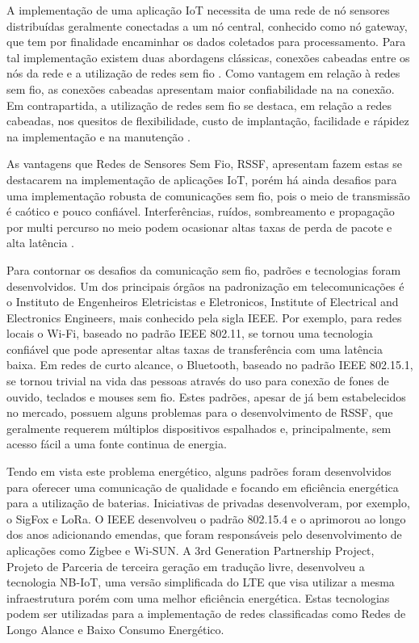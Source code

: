 A implementação de uma aplicação IoT necessita de uma rede de nó sensores distribuídas geralmente conectadas a um nó central, conhecido como nó gateway, que tem por finalidade encaminhar os dados coletados para processamento. Para tal implementação existem duas abordagens clássicas, conexões cabeadas entre os nós da rede e a utilização de redes sem fio \cite{gomes2017estimaccao}. Como vantagem em relação à redes sem fio, as conexões cabeadas apresentam maior confiabilidade na na conexão. Em contrapartida, a utilização de redes sem fio se destaca, em relação a redes cabeadas, nos quesitos de flexibilidade, custo de implantação, facilidade e rápidez na implementação e na manutenção \cite{gungor2009industrial}.

As vantagens que Redes de Sensores Sem Fio, RSSF, apresentam fazem estas se destacarem na implementação de aplicações IoT, porém há ainda desafios para uma implementação robusta de comunicações sem fio, pois o meio de transmissão é caótico e pouco confiável. Interferências, ruídos, sombreamento e propagação por multi percurso no meio podem ocasionar altas taxas de perda de pacote e alta latência \cite{gomes2017estimaccao}.

Para contornar os desafios da comunicação sem fio, padrões e tecnologias foram desenvolvidos. Um dos principais órgãos na padronização em telecomunicações é o Instituto de Engenheiros Eletricistas e Eletronicos, Institute of Electrical and Electronics Engineers, mais conhecido pela sigla IEEE. Por exemplo, para redes locais o Wi-Fi, baseado no padrão IEEE 802.11, se tornou uma tecnologia confiável que pode apresentar altas taxas de transferência com uma latência baixa. Em redes de curto alcance, o Bluetooth, baseado no padrão IEEE 802.15.1, se tornou trivial na vida das pessoas através do uso para conexão de fones de ouvido, teclados e mouses sem fio. Estes padrões, apesar de já bem estabelecidos no mercado, possuem alguns problemas para o desenvolvimento de RSSF, que geralmente requerem múltiplos dispositivos espalhados e, principalmente, sem acesso fácil a uma fonte continua de energia.

Tendo em vista este problema energético, alguns padrões foram desenvolvidos para oferecer uma comunicação de qualidade e focando em eficiência energética para a utilização de baterias. Iniciativas de privadas desenvolveram, por exemplo, o SigFox e LoRa. O IEEE desenvolveu o padrão 802.15.4 e o aprimorou ao longo dos anos adicionando emendas, que foram responsáveis pelo desenvolvimento de aplicações como Zigbee e Wi-SUN. A 3rd Generation Partnership Project, Projeto de Parceria de terceira geração em tradução livre, desenvolveu a tecnologia NB-IoT, uma versão simplificada do LTE que visa utilizar a mesma infraestrutura porém com uma melhor eficiência energética. Estas tecnologias podem ser utilizadas para a implementação de redes classificadas como Redes de Longo Alance e Baixo Consumo Energético.

